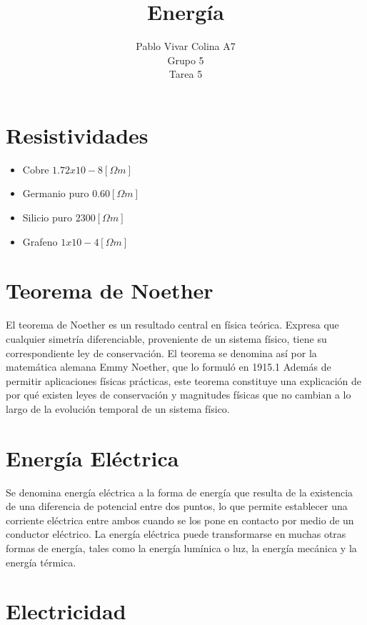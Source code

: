 \documentclass{article}
\title{Energía}
\author{Pablo Vivar Colina A7\\
Grupo 5\\
Tarea 5
}
\begin{document}
\maketitle

\section{Resistividades}

\begin{itemize}
    \item Cobre $1.72 x 10-8 [\Omega m]$ \citep{RS}
    \item Germanio puro  $0.60 [\Omega m]$ \citep{RS}
\item Silicio puro $2300 [\Omega m]$ \citep{RS}
\item  Grafeno $1 x 10-4 [\Omega m]$ \citep{Graf}
\end{itemize}


\section{Teorema de Noether}

El teorema de Noether es un resultado central en física teórica. Expresa que cualquier simetría diferenciable, proveniente de un sistema físico, tiene su correspondiente ley de conservación. El teorema se denomina así por la matemática alemana Emmy Noether, que lo formuló en 1915.1​ Además de permitir aplicaciones físicas prácticas, este teorema constituye una explicación de por qué existen leyes de conservación y magnitudes físicas que no cambian a lo largo de la evolución temporal de un sistema físico.\citep{TN}

\section{Energía Eléctrica}

Se denomina energía eléctrica a la forma de energía que resulta de la existencia de una diferencia de potencial entre dos puntos, lo que permite establecer una corriente eléctrica entre ambos cuando se los pone en contacto por medio de un conductor eléctrico. La energía eléctrica puede transformarse en muchas otras formas de energía, tales como la energía lumínica o luz, la energía mecánica y la energía térmica.\citep{EE}

\section{Electricidad}
\end{document}
